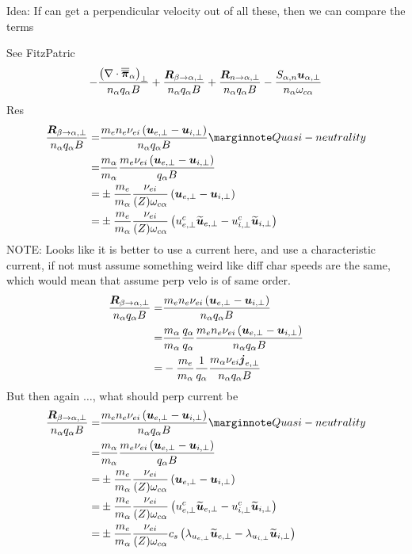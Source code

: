 Idea: If can get a perpendicular velocity out of all these, then we can compare
the terms

See FitzPatric
%
\begin{align*}
- \frac{ \left(\nabla\cdot\boldsymbol{\overline{\overline{\pi}}}_\alpha\right)_\perp }{n_\alpha  q_\alpha B}
+ \frac{ \boldsymbol{R}_{\beta \to \alpha,\perp} }{n_\alpha q_\alpha B}
+ \frac{ \boldsymbol{R}_{n \to \alpha,\perp} }{n_\alpha q_\alpha B}
- \frac{ S_{\alpha,n}\boldsymbol{u}_{\alpha,\perp} }{n_\alpha \omega_{c\alpha}}
\end{align*}
%
Res
%
\begin{align*}
\frac{ \ve{R}_{\beta \to \a,\perp} }{n_\a q_\a B}
=&
\frac{ m_en_e\nu_{ei}\L(\ve{u}_{e,\perp}-\ve{u}_{i,\perp}\R) }{n_\a q_\a B}
\note{Quasi-neutrality}
\\
=&
\frac{m_\a}{m_\a}
\frac{ m_e\nu_{ei}\L(\ve{u}_{e,\perp}-\ve{u}_{i,\perp}\R) }{q_\a B}
\\
=&
\pm
\frac{m_e}{m_\a}
\frac{\nu_{ei} }{(Z) \om_{c\a}}
\L(\ve{u}_{e,\perp}-\ve{u}_{i,\perp}\R)
\\
=&
\pm
\frac{m_e}{m_\a}
\frac{\nu_{ei} }{(Z) \om_{c\a}}
\L(u^c_{e,\perp}\wt{\ve{u}}_{e,\perp}-u^c_{i,\perp}\wt{\ve{u}}_{i,\perp}\R)
\end{align*}
%
NOTE: Looks like it is better to use a current here, and use a characteristic current, if not must assume something weird like diff char speeds are the same, which would mean that assume perp velo is of same order.
%
\begin{align*}
\frac{ \ve{R}_{\beta \to \a,\perp} }{n_\a q_\a B}
=&
\frac{ m_en_e\nu_{ei}\L(\ve{u}_{e,\perp}-\ve{u}_{i,\perp}\R) }{n_\a q_\a B}
\\
%
%
=&
\frac{m_\a}{m_\a}
\frac{q_\a}{q_\a}
\frac{ m_en_e\nu_{ei}\L(\ve{u}_{e,\perp}-\ve{u}_{i,\perp}\R) }{n_\a q_\a B}
\\
%
%
=&
-
\frac{ m_e}{m_\a}
\frac{1}{q_\a}
\frac{m_\a \nu_{ei}\ve{j}_{e,\perp} }{n_\a q_\a B}
\end{align*}
%
But then again $\ldots$, what should perp current be
%
\begin{align*}
\frac{ \ve{R}_{\beta \to \a,\perp} }{n_\a q_\a B}
=&
\frac{ m_en_e\nu_{ei}\L(\ve{u}_{e,\perp}-\ve{u}_{i,\perp}\R) }{n_\a q_\a B}
\note{Quasi-neutrality}
\\
=&
\frac{m_\a}{m_\a}
\frac{ m_e\nu_{ei}\L(\ve{u}_{e,\perp}-\ve{u}_{i,\perp}\R) }{q_\a B}
\\
=&
\pm
\frac{m_e}{m_\a}
\frac{\nu_{ei} }{(Z) \om_{c\a}}
\L(\ve{u}_{e,\perp}-\ve{u}_{i,\perp}\R)
\\
=&
\pm
\frac{m_e}{m_\a}
\frac{\nu_{ei} }{(Z) \om_{c\a}}
\L(u^c_{e,\perp}\wt{\ve{u}}_{e,\perp}-u^c_{i,\perp}\wt{\ve{u}}_{i,\perp}\R)
\\
=&
\pm
\frac{m_e}{m_\a}
\frac{\nu_{ei} }{(Z) \om_{c\a}}
c_s
\L( \lambda_{u_{e,\perp}}\wt{\ve{u}}_{e,\perp}-\lambda_{u_{i,\perp}}\wt{\ve{u}}_{i,\perp}\R)
\end{align*}
